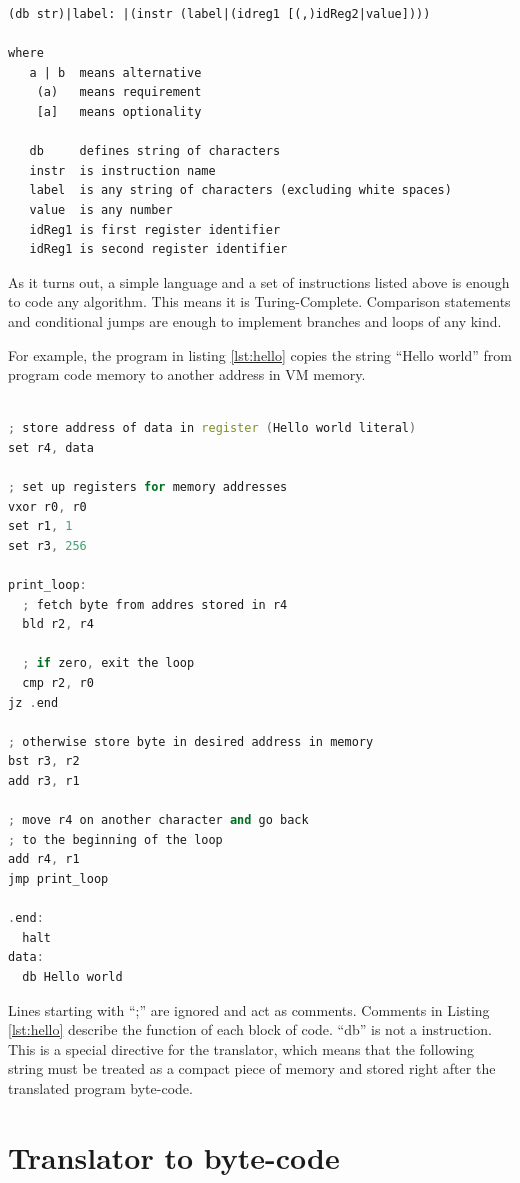 \documentclass[oneside]{book}
\begin{document}
\begin{lstlisting}
(db str)|label: |(instr (label|(idreg1 [(,)idReg2|value])))

where
   a | b  means alternative
    (a)   means requirement
    [a]   means optionality
   
   db     defines string of characters
   instr  is instruction name
   label  is any string of characters (excluding white spaces)
   value  is any number 
   idReg1 is first register identifier
   idReg1 is second register identifier   
\end{lstlisting}

As it turns out, a simple language and a set of instructions listed above is enough to code any algorithm. This means it is Turing-Complete. Comparison statements and conditional jumps are enough to implement branches and loops of any kind.

For example, the program in listing \ref{lst:hello} copies the string ``Hello world'' from program code memory to another address in VM memory.

\begin{lstlisting}[caption={Hello World assembly program}, label={lst:hello}, language=C++, style=customc]

; store address of data in register (Hello world literal)
set r4, data

; set up registers for memory addresses
vxor r0, r0
set r1, 1
set r3, 256

print_loop:
  ; fetch byte from addres stored in r4
  bld r2, r4

  ; if zero, exit the loop
  cmp r2, r0
jz .end

; otherwise store byte in desired address in memory
bst r3, r2
add r3, r1

; move r4 on another character and go back
; to the beginning of the loop
add r4, r1
jmp print_loop

.end:
  halt
data:
  db Hello world
\end{lstlisting}

\noindent
Lines starting with ``;'' are ignored and act as comments. Comments in Listing \ref{lst:hello} describe the function of each block of code.  
``db'' is not a instruction. This is a special directive for the translator, which means that the following string must be treated as a compact piece of memory and stored right after the translated program byte-code.

\section{Translator to byte-code}
\end{document}
